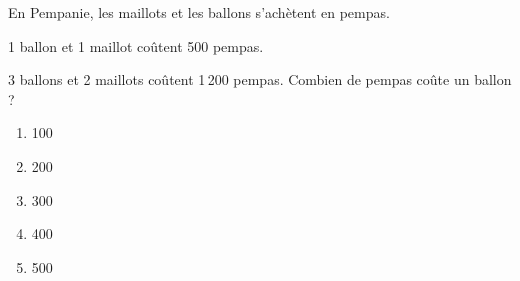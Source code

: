 En Pempanie, les maillots et les ballons s'achètent en \og pempas\fg.
\par 1 ballon et 1 maillot coûtent 500 pempas.
\par 3 ballons et 2 maillots coûtent 1\,200 pempas.
Combien de pempas coûte un ballon ?
\begin{multicols}{5}
  \begin{enumerate}[A/]
  \item 100
  \item 200
  \item 300
  \item 400
  \item 500
  \end{enumerate}
\end{multicols}